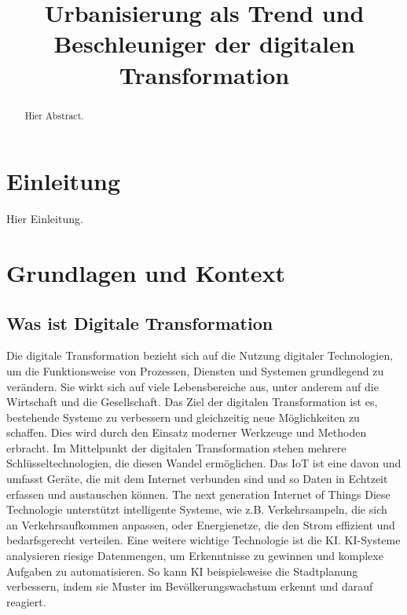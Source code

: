 \documentclass[conference,compsoc,final,a4paper, onecolumn, 11pt]{IEEEtran}
\newcommand{\dokumententitel}[0]{Urbanisierung als Trend und Beschleuniger der digitalen Transformation}
\begin{document}
\title{\dokumententitel}

\author{
  \and
  \and
}

\maketitle
\thispagestyle{plain}
\pagestyle{plain}

\begin{abstract}
Hier Abstract.
\end{abstract}

{\tableofcontents}


\section{Einleitung}
Hier Einleitung.


\section{Grundlagen und Kontext}
\subsection{Was ist Digitale Transformation}
Die digitale Transformation bezieht sich auf die Nutzung digitaler Technologien, um die Funktionsweise von Prozessen, Diensten und Systemen grundlegend zu verändern. 
Sie wirkt sich auf viele Lebensbereiche aus, unter anderem auf die Wirtschaft und die Gesellschaft. 
Das Ziel der digitalen Transformation ist es, bestehende Systeme zu verbessern und gleichzeitig neue Möglichkeiten zu schaffen. 
Dies wird durch den Einsatz moderner Werkzeuge und Methoden erbracht. \autocite{agustian_impact_2023}
Im Mittelpunkt der digitalen Transformation stehen mehrere Schlüsseltechnologien, die diesen Wandel ermöglichen. 
Das \ac{IoT} ist eine davon und umfasst Geräte, die mit dem Internet verbunden sind und so Daten in Echtzeit erfassen und austauschen können. 
The next generation Internet of Things Diese Technologie unterstützt intelligente Systeme, wie z.B. 
Verkehrsampeln, die sich an Verkehrsaufkommen anpassen, oder Energienetze, die den Strom effizient und bedarfsgerecht verteilen.
Eine weitere wichtige Technologie ist die \ac{KI}. 
\ac{KI}-Systeme analysieren riesige Datenmengen, um Erkenntnisse zu gewinnen und komplexe Aufgaben zu automatisieren. 
So kann \ac{KI} beispielsweise die Stadtplanung verbessern, indem sie Muster im Bevölkerungswachstum erkennt und darauf reagiert. \autocite{sasidhar_parasa_artificial_2023}
\end{document}
